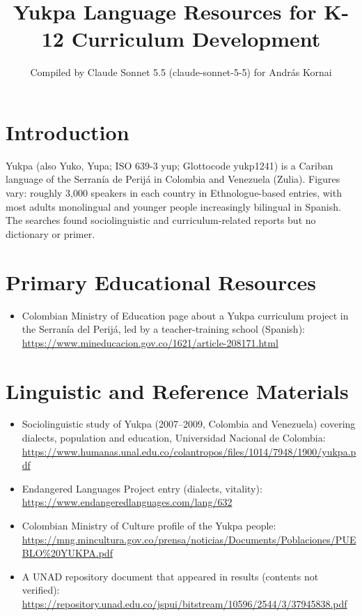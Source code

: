 \documentclass[12pt]{article}
\title{Yukpa Language Resources for K-12 Curriculum Development}
\author{Compiled by Claude Sonnet 5.5 (claude-sonnet-5-5) for Andr\'as Kornai}
\date{}
\begin{document}
\maketitle

\section{Introduction}
Yukpa (also Yuko, Yupa; ISO 639-3 yup; Glottocode yukp1241) is a Cariban language of the Serran\'ia de Perij\'a in Colombia and Venezuela (Zulia). Figures vary: roughly 3,000 speakers in each country in Ethnologue-based entries, with most adults monolingual and younger people increasingly bilingual in Spanish. The searches found sociolinguistic and curriculum-related reports but no dictionary or primer.

\section{Primary Educational Resources}
\begin{itemize}
\item Colombian Ministry of Education page about a Yukpa curriculum project in the Serran\'ia del Perij\'a, led by a teacher-training school (Spanish): \url{https://www.mineducacion.gov.co/1621/article-208171.html}
\end{itemize}

\section{Linguistic and Reference Materials}
\begin{itemize}
\item Sociolinguistic study of Yukpa (2007--2009, Colombia and Venezuela) covering dialects, population and education, Universidad Nacional de Colombia: \url{https://www.humanas.unal.edu.co/colantropos/files/1014/7948/1900/yukpa.pdf}
\item Endangered Languages Project entry (dialects, vitality): \url{https://www.endangeredlanguages.com/lang/632}
\item Colombian Ministry of Culture profile of the Yukpa people: \url{https://mng.mincultura.gov.co/prensa/noticias/Documents/Poblaciones/PUEBLO%20YUKPA.pdf}
\item A UNAD repository document that appeared in results (contents not verified): \url{https://repository.unad.edu.co/jspui/bitstream/10596/2544/3/37945838.pdf}
\end{itemize}
\end{document}
